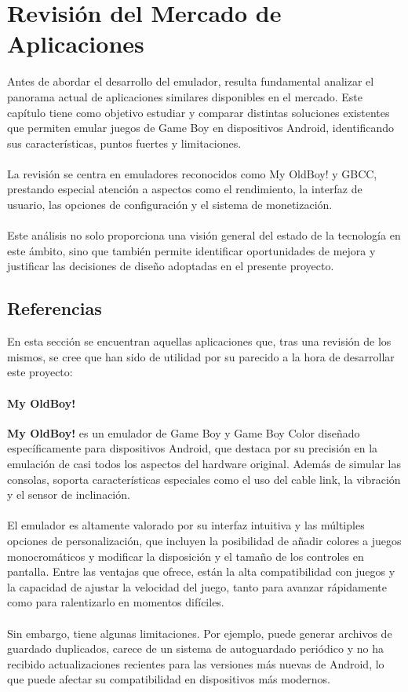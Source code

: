 \chapter{Revisión del Mercado de Aplicaciones}
\label{chap:mercado}

Antes de abordar el desarrollo del emulador, resulta fundamental analizar el panorama actual de aplicaciones similares disponibles en el mercado. Este capítulo tiene como objetivo estudiar y comparar distintas soluciones existentes que permiten emular juegos de Game Boy en dispositivos Android, identificando sus características, puntos fuertes y limitaciones.
\\\\
La revisión se centra en emuladores reconocidos como My OldBoy! y GBCC, prestando especial atención a aspectos como el rendimiento, la interfaz de usuario, las opciones de configuración y el sistema de monetización.
\\\\
Este análisis no solo proporciona una visión general del estado de la tecnología en este ámbito, sino que también permite identificar oportunidades de mejora y justificar las decisiones de diseño adoptadas en el presente proyecto.

\section{Referencias}
En esta sección se encuentran aquellas aplicaciones que, tras una revisión de los mismos, se cree que han sido de utilidad por su parecido a la hora de desarrollar este proyecto:

\subsubsection{My OldBoy!}

\textbf{My OldBoy!} es un emulador de Game Boy y Game Boy Color diseñado específicamente para dispositivos Android, que destaca por su precisión en la emulación de casi todos los aspectos del hardware original. Además de simular las consolas, soporta características especiales como el uso del cable link, la vibración y el sensor de inclinación.
\\\\
El emulador es altamente valorado por su interfaz intuitiva y las múltiples opciones de personalización, que incluyen la posibilidad de añadir colores a juegos monocromáticos y modificar la disposición y el tamaño de los controles en pantalla. Entre las ventajas que ofrece, están la alta compatibilidad con juegos y la capacidad de ajustar la velocidad del juego, tanto para avanzar rápidamente como para ralentizarlo en momentos difíciles.
\\\\
Sin embargo, tiene algunas limitaciones. Por ejemplo, puede generar archivos de guardado duplicados, carece de un sistema de autoguardado periódico y no ha recibido actualizaciones recientes para las versiones más nuevas de Android, lo que puede afectar su compatibilidad en dispositivos más modernos.


